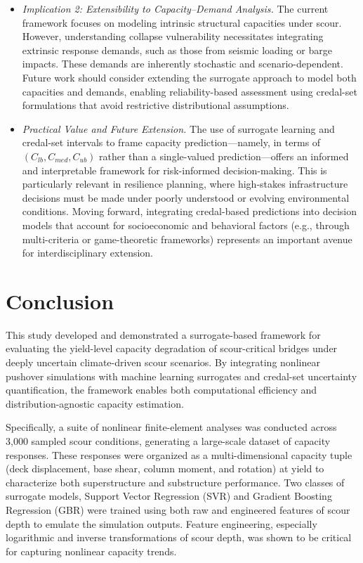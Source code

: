 \documentclass[authoryear,preprint,review,12pt]{elsarticle}
\begin{document}
\begin{itemize}
    \item \textit{Implication 2: Extensibility to Capacity–Demand Analysis.} 
    The current framework focuses on modeling intrinsic structural capacities under scour. However, understanding collapse vulnerability necessitates integrating extrinsic response demands, such as those from seismic loading or barge impacts. These demands are inherently stochastic and scenario-dependent. Future work should consider extending the surrogate approach to model both capacities and demands, enabling reliability-based assessment using credal-set formulations that avoid restrictive distributional assumptions.

    \item \textit{Practical Value and Future Extension.} 
    The use of surrogate learning and credal-set intervals to frame capacity prediction—namely, in terms of $(C_{lb}, C_{med}, C_{ub})$ rather than a single-valued prediction—offers an informed and interpretable framework for risk-informed decision-making. This is particularly relevant in resilience planning, where high-stakes infrastructure decisions must be made under poorly understood or evolving environmental conditions. Moving forward, integrating credal-based predictions into decision models that account for socioeconomic and behavioral factors (e.g., through multi-criteria or game-theoretic frameworks) represents an important avenue for interdisciplinary extension.

\end{itemize}

\section{Conclusion}

This study developed and demonstrated a surrogate-based framework for evaluating the yield-level capacity degradation of scour-critical bridges under deeply uncertain climate-driven scour scenarios. By integrating nonlinear pushover simulations with machine learning surrogates and credal-set uncertainty quantification, the framework enables both computational efficiency and distribution-agnostic capacity estimation.

Specifically, a suite of nonlinear finite-element analyses was conducted across 3,000 sampled scour conditions, generating a large-scale dataset of capacity responses. These responses were organized as a multi-dimensional capacity tuple (deck displacement, base shear, column moment, and rotation) at yield to characterize both superstructure and substructure performance. Two classes of surrogate models, Support Vector Regression (SVR) and Gradient Boosting Regression (GBR) were trained using both raw and engineered features of scour depth to emulate the simulation outputs. Feature engineering, especially logarithmic and inverse transformations of scour depth, was shown to be critical for capturing nonlinear capacity trends.
\end{document}

